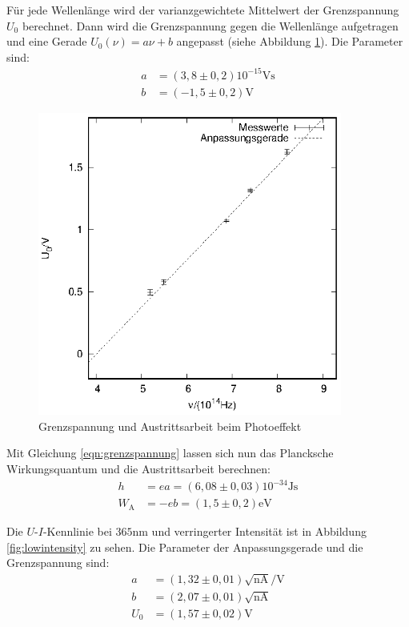 Für jede Wellenlänge wird der varianzgewichtete Mittelwert der Grenzspannung $U_0$ berechnet. Dann wird die Grenzspannung gegen die Wellenlänge aufgetragen und eine Gerade $U_0(\nu)=a\nu+b$ angepasst (siehe Abbildung \ref{planck}). Die Parameter sind: 
\begin{align*}
  a&=(3,8 \pm 0,2)10^{-15}\mathrm{Vs}\\  
  b&=(-1,5 \pm 0,2) \mathrm{V}
\end{align*}

\begin{figure}[h]
  \centering
  \includegraphics[width=10cm]{data/Messung_photoeffekt/f_u.eps}
  \caption{Grenzspannung und Austrittsarbeit beim Photoeffekt}
  \label{planck}
\end{figure}

Mit Gleichung \ref{eqn:grenzspannung} lassen sich nun das Plancksche Wirkungsquantum und die Austrittsarbeit berechnen:
\begin{align*}
  h&=ea=(6,08 \pm 0,03)10^{-34}\mathrm{Js}\\
  W_\mathrm{A}&=-eb=(1,5 \pm 0,2)\mathrm{eV}
\end{align*}

Die $U$-$I$-Kennlinie bei $365$nm und verringerter Intensität ist in Abbildung \ref{fig:lowintensity} zu sehen. Die Parameter der Anpassungsgerade und die Grenzspannung sind:
\begin{align*}
  a&=(1,32 \pm 0,01)\sqrt{\mathrm{nA}}/\mathrm{V}\\
  b&=(2,07 \pm 0,01)\sqrt{\mathrm{nA}}\\
  U_0&=(1,57 \pm 0,02)\mathrm{V}   
\end{align*}

